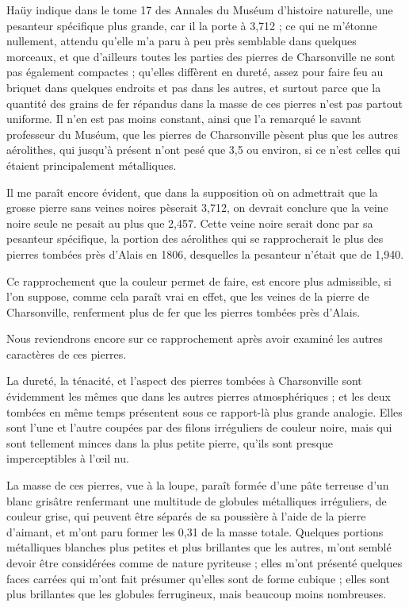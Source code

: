 \documentclass[a4paper, 12pt, oneside, french]{article}
\begin{document}
Haüy indique dans le tome 17 des Annales du Muséum d'histoire naturelle, une pesanteur spécifique plus grande, car il la porte à 3,712 ; ce qui ne m'étonne nullement, attendu qu'elle m'a paru à peu près semblable dans quelques morceaux, et que d'ailleurs toutes les parties des pierres de Charsonville ne sont pas également compactes ; qu'elles diffèrent en dureté, assez pour faire feu au briquet dans quelques endroits et pas dans les autres, et surtout parce que la quantité des grains de fer répandus dans la masse de ces pierres n'est pas partout uniforme. Il n'en est pas moins constant, ainsi que l'a remarqué le savant professeur du Muséum, que les pierres de Charsonville pèsent plus que les autres aérolithes, qui jusqu'à présent n'ont pesé que 3,5 ou environ, si ce n'est celles qui étaient principalement métalliques.

Il me paraît encore évident, que dans la supposition où on admettrait que la grosse pierre sans veines noires pèserait 3,712, on devrait conclure que la veine noire seule ne pesait au plus que 2,457. Cette veine noire serait donc par sa pesanteur spécifique, la portion des aérolithes qui se rapprocherait le plus des pierres tombées près d'Alais en 1806, desquelles la pesanteur n'était que de 1,940.

Ce rapprochement que la couleur permet de faire, est encore plus admissible, si l'on suppose, comme cela paraît vrai en effet, que les veines de la pierre de Charsonville, renferment plus de fer que les pierres tombées près d'Alais.

Nous reviendrons encore sur ce rapprochement après avoir examiné les autres caractères de ces pierres.

La dureté, la ténacité, et l'aspect des pierres tombées à Charsonville sont évidemment les mêmes que dans les autres pierres atmosphériques ; et les deux tombées en même temps présentent sous ce rapport-là plus grande analogie. Elles sont l'une et l'autre coupées par des filons irréguliers de couleur noire, mais qui sont tellement minces dans la plus petite pierre, qu'ils sont presque imperceptibles à l'œil nu.

La masse de ces pierres, vue à la loupe, paraît formée d'une pâte terreuse d'un blanc grisâtre renfermant une multitude de globules métalliques irréguliers, de couleur grise, qui peuvent être séparés de sa poussière à l'aide de la pierre d'aimant, et m'ont paru former les 0,31 de la masse totale. Quelques portions métalliques blanches plus petites et plus brillantes que les autres, m'ont semblé devoir être considérées comme de nature pyriteuse ; elles m'ont présenté quelques faces carrées qui m'ont fait présumer qu'elles sont de forme cubique ; elles sont plus brillantes que les globules ferrugineux, mais beaucoup moins nombreuses.
\end{document}

